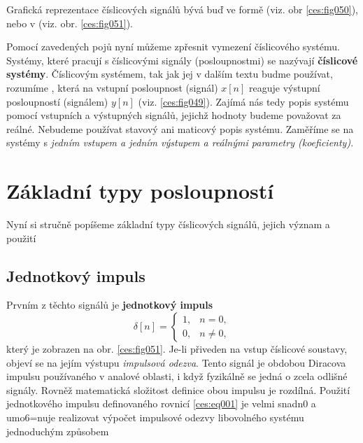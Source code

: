     Grafická reprezentace číslicových signálů bývá buď ve  formě (viz. obr
    \ref{ces:fig050}), nebo v  (viz. obr. \ref{ces:fig051}).

  

    Pomocí zavedených pojů nyní můžeme zpřesnit vymezení číslicového systému. Systémy, které pracují
    s číslicovými signály (posloupnostmi) se nazývají \textbf{číslicové systémy}. Číslicovým
    systémem, tak jak jej v dalším textu budme používat, rozumíme , která na
    vstupní posloupnost (signál) \(x[n]\) reaguje výstupní posloupností (signálem) \(y[n]\) (viz.
    \ref{ces:fig049}). Zajímá nás tedy popis systému pomocí vstupních a výstupných signálů, jejichž
    hodnoty budeme považovat za reálné. Nebudeme používat stavový ani maticový popis systému.
    Zaměříme se na systémy s \emph{jedním vstupem a jedním výstupem a reálnými parametry
    (koeficienty)}.
    

  \section{Základní typy posloupností}\label{ces:IchapIsecII}
    Nyní si stručně popíšeme základní typy číslicových signálů, jejich význam a použití

    \subsection{Jednotkový impuls}
      Prvním z těchto signálů je \textbf{jednotkový impuls}
      \begin{equation}\label{ces:eq001}
        \delta[n]=
        \begin{cases} 
            1, &  n = 0, \\
             0, &  n \neq 0,
        \end{cases}
      \end{equation}
      který je zobrazen na obr. \ref{ces:fig051}. Je-li přiveden na vstup číslicové soustavy,
      objeví se na jejím výstupu \emph{impulsová odezva}. Tento signál je obdobou Diracova
      impulsu používaného v analové oblasti, i když fyzikálně se jedná o zcela odlišné
      signály. Rovněž matematická složitost definice obou impulsu je rozdílná. Použití
      jednotkového impulsu definovaného rovnicí \ref{ces:eq001} je velmi snadn0 a umo6=nuje
      realizovat výpočet impulsové odezvy libovolného systému jednoduchým způsobem
            

